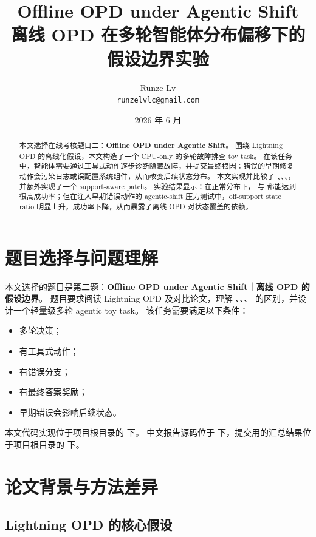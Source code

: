 \documentclass[11pt]{ctexart}
\title{\textbf{Offline OPD under Agentic Shift}\\
\large 离线 OPD 在多轮智能体分布偏移下的假设边界实验}
\author{Runze Lv\\\texttt{runzelvlc@gmail.com}}
\date{2026 年 6 月}
\begin{document}
\maketitle

\begin{abstract}
本文选择在线考核题目二：\textbf{Offline OPD under Agentic Shift}。
围绕 Lightning OPD 的离线化假设，本文构造了一个 CPU-only 的多轮故障排查 toy task。
在该任务中，智能体需要通过工具式动作逐步诊断隐藏故障，并提交最终根因；错误的早期修复动作会污染日志或误配置系统组件，从而改变后续状态分布。
本文实现并比较了 \sft{}、\onlinerl{}、\offlineopd{}、\onlineopd{}，并额外实现了一个 support-aware \offlineopd{} patch。
实验结果显示：在正常分布下，\sft{} 与 \offlineopd{} 都能达到很高成功率；但在注入早期错误动作的 agentic-shift 压力测试中，off-support state ratio 明显上升，成功率下降，从而暴露了离线 OPD 对状态覆盖的依赖。
\end{abstract}

\section{题目选择与问题理解}

本文选择的题目是第二题：\textbf{Offline OPD under Agentic Shift｜离线 OPD 的假设边界}。
题目要求阅读 Lightning OPD 及对比论文，理解 \sft{}、\onlinerl{}、\onlineopd{}、\offlineopd{} 的区别，并设计一个轻量级多轮 agentic toy task。
该任务需要满足以下条件：

\begin{itemize}
    \item 多轮决策；
    \item 有工具式动作；
    \item 有错误分支；
    \item 有最终答案奖励；
    \item 早期错误会影响后续状态。
\end{itemize}

本文代码实现位于项目根目录的  下。
中文报告源码位于  下，提交用的汇总结果位于项目根目录的  下。

\section{论文背景与方法差异}

\subsection{Lightning OPD 的核心假设}
\end{document}
